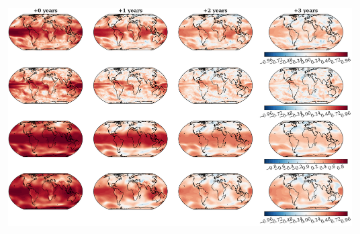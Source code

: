 \documentclass[parskip=half,DIV=16]{scrartcl}
\begin{document}
\begin{figure}[h]
    \centering

    \begin{subfigure}[c]{0.77\textwidth}
        \includegraphics[width=\textwidth]{figures/plots/corr_spatial.pdf}
        \label{fig:corr-spatial-mine}
    \end{subfigure}
    \hfill
    \begin{subfigure}[c]{0.22\textwidth}

\end{subfigure}
\end{figure}
\end{document}
